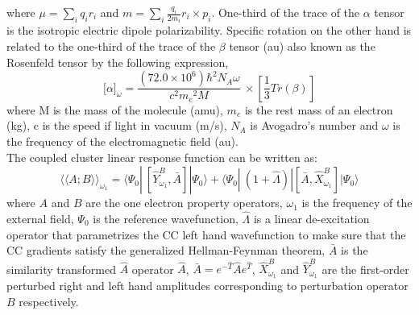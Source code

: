 where $\mu = \sum_i q_i r_i $ and $m = \sum_i \frac{q_i}{2m_i} r_i \times p_i$. 
One-third of the trace of the $\alpha$ tensor is the isotropic 
electric dipole polarizability. Specific rotation on the other hand 
is related to the one-third of the trace of the $\beta$ tensor (au) 
also known as the Rosenfeld tensor by the following expression\cite{},
\begin{equation}
{\lbrack\alpha\rbrack}_{\omega} = \frac{(72.0 \times 10^6){\hbar}^2 N_A\omega}{c^2{m_e}^2 M}
\ \times \left[ \frac{1}{3}Tr(\beta)\right]
\end{equation}
where M is the mass of the molecule (amu), $m_e$ is the rest mass of an electron
(kg), c is the speed if light in vacuum (m/s), $N_A$ is Avogadro's number and $\omega$
is the frequency of the electromagnetic field (au). \\
The coupled cluster linear response function can be written as\cite{}: 
\begin{equation}
{\langle\langle A;B\rangle\rangle}_{\omega_1} =  \langle \Psi_0 | \
[\hat{Y}^{B}_{\omega_1}, \bar{A}]|\Psi_0\rangle + \langle \Psi_0 | \
(1 + \hat{\Lambda})|[\bar{A},\hat{X}^{B}_{\omega_1}]|\Psi_0\rangle 
\end{equation}
where $A$ and $B$ are the one electron property operators,
$\omega_1$ is the frequency of the external field, 
$\Psi_0$ is the reference wavefunction, $\hat{\Lambda}$ is 
a linear de-excitation operator that parametrizes the CC left hand 
wavefunction to make sure that the CC gradients satisfy the 
generalized Hellman-Feynman theorem\cite{}, $\bar{A}$ is the 
similarity transformed $\hat{A}$ operator $\hat{A}$, $\bar{A} = e^{-\hat{T}}\hat{A}e^{\hat{T}}$,
$\hat{X}^{B}_{\omega_1}$ and $\hat{Y}^{B}_{\omega_1}$ are the first-order 
perturbed right and left hand amplitudes corresponding to perturbation operator 
$B$ respectively. 
